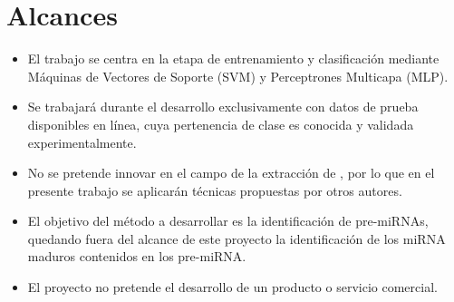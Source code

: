 %
%
%
\section{Alcances}
%
\begin{itemize}
\item El trabajo se centra en la etapa de entrenamiento y
  clasificación mediante Máquinas de Vectores de Soporte (SVM) y
  Perceptrones Multicapa (MLP).
\item Se trabajará durante el desarrollo exclusivamente con datos de
  prueba disponibles en línea, cuya pertenencia de clase es conocida y
  validada experimentalmente.
\item No se pretende innovar en el campo de la extracción de
  , por lo que en el presente trabajo se aplicarán técnicas
  propuestas por otros autores.
\item El objetivo del método a desarrollar es la identificación de
  pre-miRNAs, quedando fuera del alcance de este proyecto la
  identificación de los miRNA maduros contenidos en los pre-miRNA.
\item El proyecto no pretende el desarrollo de un producto o servicio
  comercial.
\end{itemize}

